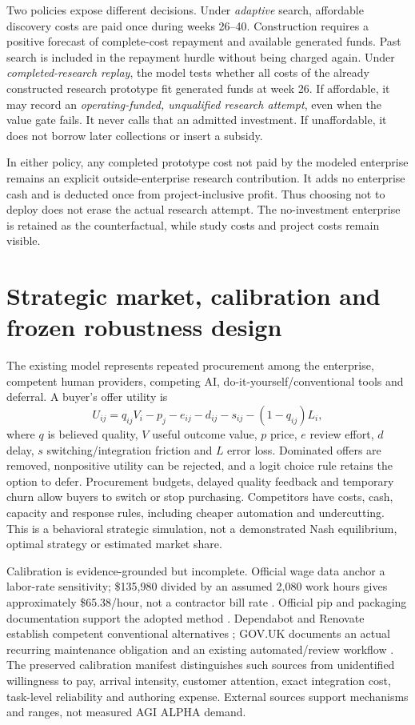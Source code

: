 \documentclass[11pt,letterpaper]{article}
\newcommand{\USD}[1]{\$#1}
\begin{document}
Two policies expose different decisions. Under \emph{adaptive} search, affordable discovery costs are paid once during weeks 26--40. Construction requires a positive forecast of complete-cost repayment and available generated funds. Past search is included in the repayment hurdle without being charged again. Under \emph{completed-research replay}, the model tests whether all costs of the already constructed research prototype fit generated funds at week 26. If affordable, it may record an \emph{operating-funded, unqualified research attempt}, even when the value gate fails. It never calls that an admitted investment. If unaffordable, it does not borrow later collections or insert a subsidy.

In either policy, any completed prototype cost not paid by the modeled enterprise remains an explicit outside-enterprise research contribution. It adds no enterprise cash and is deducted once from project-inclusive profit. Thus choosing not to deploy does not erase the actual research attempt. The no-investment enterprise is retained as the counterfactual, while study costs and project costs remain visible.

\section{Strategic market, calibration and frozen robustness design}

The existing model represents repeated procurement among the enterprise, competent human providers, competing AI, do-it-yourself/conventional tools and deferral. A buyer's offer utility is
\begin{equation}
U_{ij}=q_{ij}V_i-p_j-e_{ij}-d_{ij}-s_{ij}-(1-q_{ij})L_i,
\end{equation}
where $q$ is believed quality, $V$ useful outcome value, $p$ price, $e$ review effort, $d$ delay, $s$ switching/integration friction and $L$ error loss. Dominated offers are removed, nonpositive utility can be rejected, and a logit choice rule retains the option to defer. Procurement budgets, delayed quality feedback and temporary churn allow buyers to switch or stop purchasing. Competitors have costs, cash, capacity and response rules, including cheaper automation and undercutting. This is a behavioral strategic simulation, not a demonstrated Nash equilibrium, optimal strategy or estimated market share.

Calibration is evidence-grounded but incomplete. Official wage data anchor a labor-rate sensitivity; \USD{135,980} divided by an assumed 2,080 work hours gives approximately \USD{65.38}/hour, not a contractor bill rate \cite{bls}. Official pip and packaging documentation support the adopted method \cite{pip,metadata,pipcheck}. Dependabot and Renovate establish competent conventional alternatives \cite{dependabot,renovate}; GOV.UK documents an actual recurring maintenance obligation and an existing automated/review workflow \cite{govuk}. The preserved calibration manifest distinguishes such sources from unidentified willingness to pay, arrival intensity, customer attention, exact integration cost, task-level reliability and authoring expense. External sources support mechanisms and ranges, not measured AGI ALPHA demand.
\end{document}
